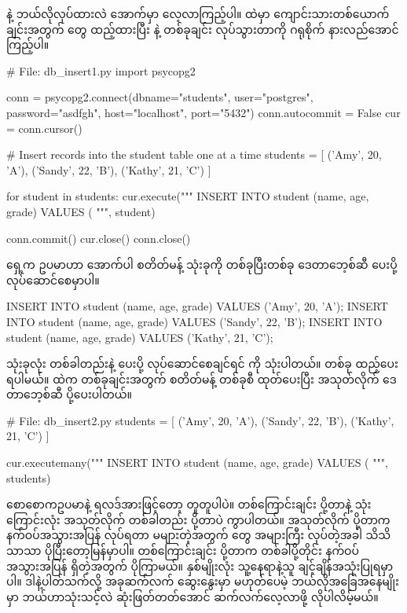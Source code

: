  နဲ့  ဘယ်လိုလုပ်ထားလဲ အောက်မှာ လေ့လာကြည့်ပါ။   ထဲမှာ ကျောင်းသားတစ်ယောက်ချင်းအတွက်  တွေ ထည့်ထားပြီး   နဲ့ တစ်ခုချင်း  လုပ်သွားတာကို ဂရုစိုက် နားလည်အောင် ကြည့်ပါ။
%
\begin{py}
# File: db_insert1.py
import psycopg2

conn = psycopg2.connect(dbname="students", user="postgres",
                        password="asdfgh", host="localhost", port="5432")
conn.autocommit = False
cur = conn.cursor()

# Insert records into the student table one at a time
students = [
    ('Amy', 20, 'A'),
    ('Sandy', 22, 'B'),
    ('Kathy', 21, 'C')
]

for student in students:
    cur.execute("""
        INSERT INTO student (name, age, grade)
        VALUES (%
    """, student)

conn.commit()
cur.close()
conn.close()
\end{py}
%


ရှေ့က ဥပမာဟာ အောက်ပါ  စတိတ်မန့် သုံးခုကို တစ်ခုပြီးတစ်ခု ဒေတာဘေ့စ်ဆီ ပေးပို့ လုပ်ဆောင်စေမှာပါ။ 

%
\begin{sql}
INSERT INTO student (name, age, grade) VALUES ('Amy', 20, 'A');
INSERT INTO student (name, age, grade) VALUES ('Sandy', 22, 'B');
INSERT INTO student (name, age, grade) VALUES ('Kathy', 21, 'C');
\end{sql}
%

 သုံးခုလုံး တစ်ခါတည်းနဲ့ ပေးပို့ လုပ်ဆောင်စေချင်ရင်  ကို သုံးပါတယ်။  တစ်ခု ထည့်ပေးရပါမယ်။  ထဲက  တစ်ခုချင်းအတွက်  စတိတ်မန့် တစ်ခုစီ ထုတ်ပေးပြီး အသုတ်လိုက် ဒေတာဘေ့စ်ဆီ ပို့ပေးပါတယ်။
%
\begin{py}
# File: db_insert2.py
students = [
    ('Amy', 20, 'A'),
    ('Sandy', 22, 'B'),
    ('Kathy', 21, 'C')
]

cur.executemany("""
    INSERT INTO student (name, age, grade)
    VALUES (%
""", students)
\end{py}
%
စောစောကဥပမာနဲ့ ရလဒ်အားဖြင့်တော့ တူတူပါပဲ။ တစ်ကြောင်းချင်း ပို့တာနဲ့  သုံးကြောင်းလုံး အသုတ်လိုက် တစ်ခါတည်း ပို့တာပဲ ကွာပါတယ်။ အသုတ်လိုက် ပို့တာက နက်ဝပ်အသွားအပြန်  လုပ်ရတာ မများတဲ့အတွက်  တွေ အများကြီး  လုပ်တဲ့အခါ သိသိသာသာ ပိုပြီးတော့မြန်မှာပါ။ တစ်ကြောင်းချင်း ပို့တာက တစ်ခါပို့တိုင်း နက်ဝပ်အသွားအပြန် ရှိတဲ့အတွက် ပိုကြာမယ်။ နှစ်မျိုးလုံး သူ့နေရာနဲ့သူ ချင့်ချိန်အသုံးပြုရမှာပါ။ ဒါနဲ့ပါတ်သက်လို့ အခုဆက်လက် ဆွေးနွေးမှာ မဟုတ်ပေမဲ့ ဘယ်လိုအခြေအနေမျိုးမှာ ဘယ်ဟာသုံးသင့်လဲ ဆုံးဖြတ်တတ်အောင် ဆက်လက်လေ့လာဖို့ လိုပါလိမ့်မယ်။ 

